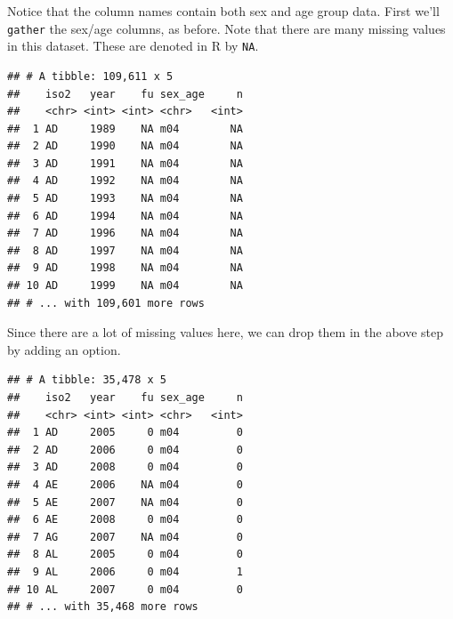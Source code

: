\documentclass[12pt,letterpaperpaper,openany]{book}
\newenvironment{Shaded}{\begin{snugshade}}{\end{snugshade}}
\newcommand{\DataTypeTok}[1]{\textcolor[rgb]{0.13,0.29,0.53}{#1}}
\newcommand{\KeywordTok}[1]{\textcolor[rgb]{0.13,0.29,0.53}{\textbf{#1}}}
\newcommand{\NormalTok}[1]{#1}
\newcommand{\OperatorTok}[1]{\textcolor[rgb]{0.81,0.36,0.00}{\textbf{#1}}}
\newcommand{\StringTok}[1]{\textcolor[rgb]{0.31,0.60,0.02}{#1}}
\begin{document}
Notice that the column names contain both sex and age group data. First we'll \texttt{gather}
the sex/age columns, as before. Note that there are many missing values in this dataset. These
are denoted in R by \texttt{NA}.

\begin{Shaded}
\end{Shaded}

\begin{verbatim}
## # A tibble: 109,611 x 5
##    iso2   year    fu sex_age     n
##    <chr> <int> <int> <chr>   <int>
##  1 AD     1989    NA m04        NA
##  2 AD     1990    NA m04        NA
##  3 AD     1991    NA m04        NA
##  4 AD     1992    NA m04        NA
##  5 AD     1993    NA m04        NA
##  6 AD     1994    NA m04        NA
##  7 AD     1996    NA m04        NA
##  8 AD     1997    NA m04        NA
##  9 AD     1998    NA m04        NA
## 10 AD     1999    NA m04        NA
## # ... with 109,601 more rows
\end{verbatim}

Since there are a lot of missing values here, we can drop them in the above step by adding an option.

\begin{Shaded}
\end{Shaded}

\begin{verbatim}
## # A tibble: 35,478 x 5
##    iso2   year    fu sex_age     n
##    <chr> <int> <int> <chr>   <int>
##  1 AD     2005     0 m04         0
##  2 AD     2006     0 m04         0
##  3 AD     2008     0 m04         0
##  4 AE     2006    NA m04         0
##  5 AE     2007    NA m04         0
##  6 AE     2008     0 m04         0
##  7 AG     2007    NA m04         0
##  8 AL     2005     0 m04         0
##  9 AL     2006     0 m04         1
## 10 AL     2007     0 m04         0
## # ... with 35,468 more rows
\end{verbatim}
\end{document}
